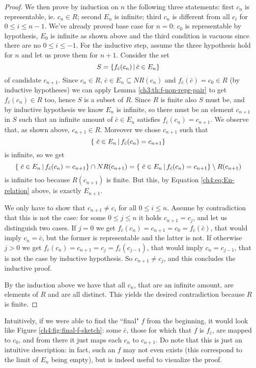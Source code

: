 \begin{proof}
	We then prove by induction on $n$ the following three statements: first $c_n$ is representable, ie. $c_n \in R$; second $E_n$ is infinite; third $c_n$ is different from all $c_i$ for $0 \le i \le n - 1$.
	We've already proved base case for $n = 0$: $c_0$ is representable by hypothesis, $E_0$ is infinite as shown above and the third condition is vacuous since there are no $0 \le i \le -1$.
	For the inductive step, assume the three hypothesis hold for $n$ and let us prove them for $n + 1$.
	Consider the set
	\[
	S = \{ f_{\bar{c}}(c_n) \,\vert\, \bar{c} \in E_n \}
	\]
	of candidate $c_{n+1}$.
	Since $c_n \in R$, $\bar{c} \in E_n \subseteq NR(c_n)$ and $f_{\bar{c}}(\bar{c}) = c_0 \in R$ (by inductive hypotheses) we can apply Lemma \ref{ch3:th:f-non-repr-pair} to get $f_{\bar{c}}(c_n) \in R$ too, hence $S$ is a subset of $R$.
	Since $R$ is finite also $S$ must be, and by inductive hypothesis we know $E_n$ is infinite, so there must be an element $c_{n+1}$ in $S$ such that an infinite amount of $\bar{c} \in E_n$ satisfies $f_{\bar{c}}(c_n) = c_{n+1}$. We observe that, as shown above, $c_{n+1} \in R$. Moreover we chose $c_{n+1}$ such that
	\[
	\{\ \bar{c} \in E_n \,\vert\, f_{\bar{c}}(c_n) = c_{n+1} \}
	\]
	is infinite, so we get
	\[
	\{\ \bar{c} \in E_n \,\vert\, f_{\bar{c}}(c_n) = c_{n+1} \} \cap NR(c_{n+1}) = \{\ \bar{c} \in E_n \,\vert\, f_{\bar{c}}(c_n) = c_{n+1} \} \setminus R(c_{n+1})
	\]
	is infinite too because $R(c_{n+1})$ is finite. But this, by Equation \eqref{ch4:eq:En-relation} above, is exactly $E_{n+1}$.

	We only have to show that $c_{n+1} \neq c_i$ for all $0 \le i \le n$. Assume by contradiction that this is not the case: for some $0 \le j \le n$ it holds $c_{n+1} = c_j$, and let us distinguish two cases. If $j = 0$ we get $f_{\bar{c}}(c_n) = c_{n+1} = c_0 = f_{\bar{c}}(\bar{c})$, that would imply $c_n = \bar{c}$, but the former is representable and the latter is not. If otherwise $j > 0$ we get $f_{\bar{c}}(c_n) = c_{n+1} = c_j = f_{\bar{c}}(c_{j-1})$, that would imply $c_n = c_{j-1}$, that is not the case by inductive hypothesis. So $c_{n+1} \neq c_j$, and this concludes the inductive proof.

	By the induction above we have that all $c_n$, that are an infinite amount, are elements of $R$ and are all distinct. This yields the desired contradiction because $R$ is finite.
\end{proof}

Intuitively, if we were able to find the ``final" $f$ from the beginning, it would look like Figure \ref{ch4:fig:final-f-sketch}: some $\bar{c}$, those for which that $f$ is $f_{\bar{c}}$, are mapped to $c_0$, and from there it just maps each $c_n$ to $c_{n+1}$. Do note that this is just an intuitive description: in fact, such an $f$ may not even exists (this correspond to the limit of $E_n$ being empty), but is indeed useful to visualize the proof.


